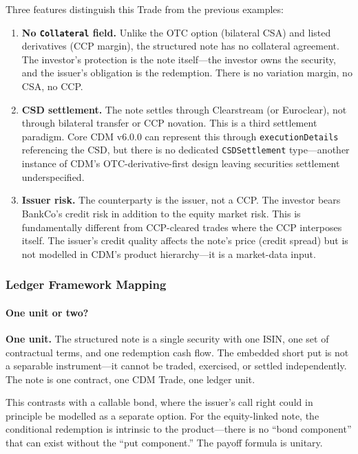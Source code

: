 \documentclass[11pt,a4paper]{article}
\begin{document}
\noindent Three features distinguish this Trade from the previous examples:

\begin{enumerate}[nosep]
\item \textbf{No \texttt{Collateral} field.} Unlike the OTC option (bilateral CSA) and listed derivatives (CCP margin), the structured note has no collateral agreement. The investor's protection is the note itself---the investor owns the security, and the issuer's obligation is the redemption. There is no variation margin, no CSA, no CCP.
\item \textbf{CSD settlement.} The note settles through Clearstream (or Euroclear), not through bilateral transfer or CCP novation. This is a third settlement paradigm. Core CDM v6.0.0 can represent this through \texttt{executionDetails} referencing the CSD, but there is no dedicated \texttt{CSDSettlement} type---another instance of CDM's OTC-derivative-first design leaving securities settlement underspecified.
\item \textbf{Issuer risk.} The counterparty is the issuer, not a CCP. The investor bears BankCo's credit risk in addition to the equity market risk. This is fundamentally different from CCP-cleared trades where the CCP interposes itself. The issuer's credit quality affects the note's price (credit spread) but is not modelled in CDM's product hierarchy---it is a market-data input.
\end{enumerate}

\subsubsection{Ledger Framework Mapping}
\label{sec:cdm-sn-framework-mapping}

\paragraph{One unit or two?}

\textbf{One unit.} The structured note is a single security with one ISIN, one set of contractual terms, and one redemption cash flow. The embedded short put is not a separable instrument---it cannot be traded, exercised, or settled independently. The note is one contract, one CDM Trade, one ledger unit.

This contrasts with a callable bond, where the issuer's call right could in principle be modelled as a separate option. For the equity-linked note, the conditional redemption is intrinsic to the product---there is no ``bond component'' that can exist without the ``put component.'' The payoff formula is unitary.
\end{document}
